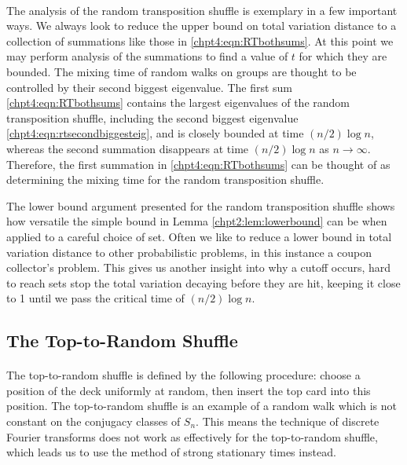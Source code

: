 \documentclass[11pt]{report}
\begin{document}
\paragraph{}
The analysis of the random transposition shuffle is exemplary in a few important ways.  We always look to reduce the upper bound on total variation distance to a collection of summations like those in \eqref{chpt4:eqn:RTbothsums}. At this point we may perform analysis of the summations to find a value of $t$ for which they are bounded. The mixing time of random walks on groups are thought to be controlled by their second biggest eigenvalue. The first sum \eqref{chpt4:eqn:RTbothsums} contains the largest eigenvalues of the random transposition shuffle, including the second biggest eigenvalue \eqref{chpt4:eqn:rtsecondbiggesteig}, and is closely bounded at time $(n/2)\log n$, whereas the second summation disappears at time $(n/2)\log n$ as $n\to\infty$. Therefore, the first summation in  \eqref{chpt4:eqn:RTbothsums} can be thought of as determining the mixing time for the random transposition shuffle.

The lower bound argument presented for the random transposition shuffle  shows how versatile the simple bound in Lemma \ref{chpt2:lem:lowerbound} can be when applied to a careful choice of set. Often we like to reduce a lower bound in total variation distance to other probabilistic problems, in this instance a coupon collector's problem. This gives us another insight into why a cutoff occurs, hard to reach sets stop the total variation decaying before they are hit, keeping it close to 1 until we pass the critical time of $(n/2)\log n$.








\subsection{The Top-to-Random Shuffle}
\label{chpt4:subsec:t2r}




\paragraph{}
The top-to-random shuffle is defined by the following procedure: choose 
a position of the deck uniformly at random, then insert the top card into 
this position. The top-to-random shuffle is an example of a random walk which 
is not constant on the conjugacy classes of $S_{n}$. This means the 
technique of discrete Fourier transforms does not work as effectively for the top-to-random shuffle, which leads us to use the method of strong stationary times instead.
\end{document}
